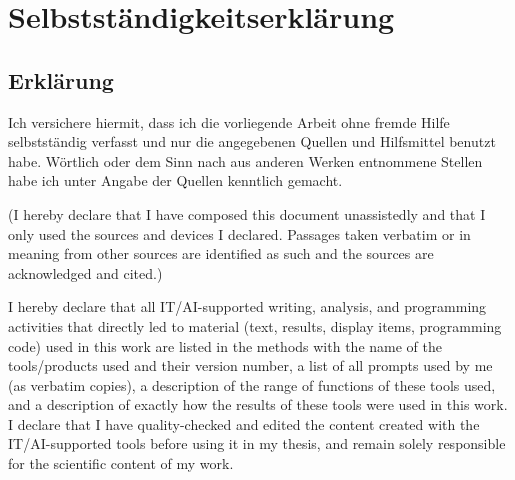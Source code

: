 \chapter*{Selbstständigkeitserklärung} %

\vspace{2cm}

\section*{Erklärung}

Ich versichere hiermit, dass ich die vorliegende Arbeit ohne fremde Hilfe selbstständig verfasst und nur die angegebenen Quellen und Hilfsmittel benutzt habe. Wörtlich oder dem Sinn nach aus anderen Werken entnommene Stellen habe ich unter Angabe der Quellen kenntlich gemacht.

\medskip
\noindent (I hereby declare that I have composed this document unassistedly and that I only used the sources and devices I declared. Passages taken verbatim or in meaning from other sources are identified as such and the sources are acknowledged and cited.)

I hereby declare that all IT/AI-supported writing, analysis, and programming activities that directly led to material (text, results, display items, programming code) used in this work are listed in the methods with the name of the tools/products used and their version number, a list of all prompts used by me (as verbatim copies), a description of the range of functions of these tools used, and a description of exactly how the results of these tools were used in this work. I declare that I have quality-checked and edited the content created with the IT/AI-supported tools before using it in my thesis, and remain solely responsible for the scientific content of my work.


\vspace{2cm}

\noindent \year
